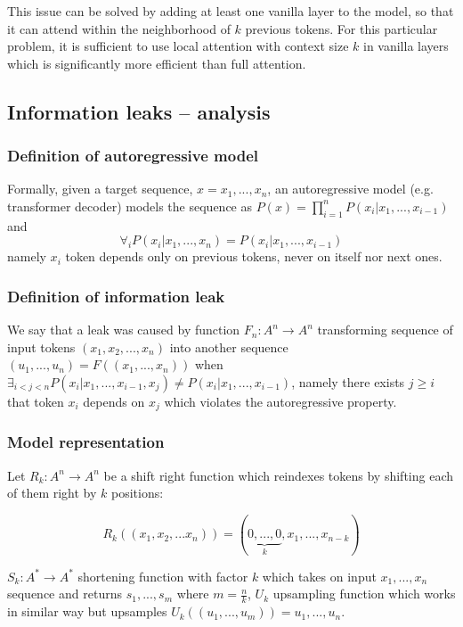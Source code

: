 \documentclass[11pt]{article}
\begin{document}
This issue can be solved by adding at least one vanilla layer to the model, so that it can attend within the neighborhood of $k$ previous tokens. For this particular problem, it is sufficient to use local attention with context size $k$ in vanilla layers which is significantly more efficient than full attention.

\subsection{Information leaks -- analysis}\label{sec:appendix.leak}
\subsubsection{Definition of autoregressive model}
Formally, given a target sequence, $x = x_1, ..., x_n$, an autoregressive model (e.g. transformer decoder) models the sequence as $P(x) = \prod_{i=1}^{n} P(x_i | x_1,...,x_{i-1})$ and $$\forall_i P(x_i | x_1,...,x_n) = P(x_i | x_1,...,x_{i-1})$$ namely $x_i$ token depends only on previous tokens, never on itself nor next ones.

\subsubsection{Definition of information leak}
We say that a leak was caused by function $F_n\colon A^n \longrightarrow A^n$ transforming sequence of input tokens $(x_1, x_2, ... ,x_n)$ into another sequence $(u_1, ..., u_n) = F((x_1,..., x_n))$ when $\exists_{i<j<n} P(x_i | x_1, ..., x_{i-1}, x_j) \neq P(x_i | x_1, ..., x_{i-1})$, namely there exists $j \ge i$ that token $x_i$ depends on $x_j$ which violates the autoregressive property.

\subsubsection{Model representation}


Let $R_k\colon A^n \longrightarrow A^n$ be a shift right function which reindexes tokens by shifting each of them right by $k$ positions:

$$R_k((x_1,x_2,...x_n)) = (\underbrace{0,...,0}_{k},x_1,...,x_{n-k})$$

$S_k: A^* \longrightarrow A^*$ shortening function with factor $k$ which takes on input $x_1, ..., x_n$ sequence and returns $s_1, ..., s_m$ where $m=\frac{n}{k}$, $U_k$ upsampling function which works in similar way but upsamples $U_k((u_1,...,u_m))=u_1,...,u_n$.
\end{document}
